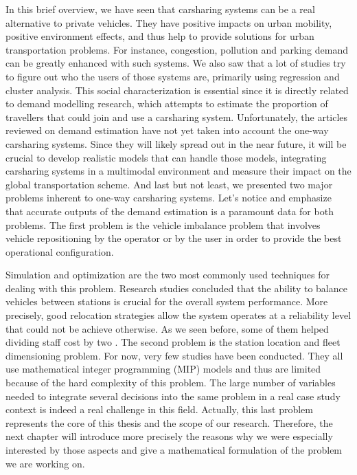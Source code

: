 \begin{bibunit}[ieeetr]
In this brief overview, we have seen that carsharing systems can be a real alternative to private vehicles.
They have positive impacts on urban mobility, positive environment effects, and thus help to provide solutions for urban transportation problems.
For instance, congestion, pollution and parking demand can be greatly enhanced with such systems.
We also saw that a lot of studies try to figure out who the users of those systems are, primarily
using regression and cluster analysis.
This social characterization is essential since it is directly related to demand modelling research, which attempts to estimate the proportion of
travellers that could join and use a carsharing system.
Unfortunately, the articles reviewed on demand estimation have not yet taken into account the one-way carsharing systems.
Since they will likely spread out in the near future, it will be crucial to develop realistic models that can handle those models, integrating carsharing systems in a multimodal environment and measure their impact on the global transportation scheme.
And last but not least, we presented two major problems inherent to one-way carsharing systems.
Let's notice and emphasize that accurate outputs of the demand estimation is a paramount data for both problems.
The first problem is the vehicle imbalance problem that involves vehicle repositioning by the operator or by the user in order to provide the best operational configuration.

\medskip
Simulation and optimization are the two most commonly used techniques for dealing with this problem.
Research studies concluded that the ability to balance vehicles between stations is crucial for the overall system performance.
More precisely, good relocation strategies allow the system operates at a reliability level that could not be achieve otherwise.
As we seen before, some of them helped dividing staff cost by two \cite{kek_decision_2009}.
The second problem is the station location and  fleet dimensioning problem.
For now, very few studies have been conducted.
They all use mathematical integer programming (MIP) models and thus are limited because of the hard complexity of this problem.
The large number of variables needed to integrate several decisions into the same problem in a real case study context is indeed a real challenge in this field.
Actually, this last problem represents the core of this thesis and the scope of our research.
Therefore, the next chapter will introduce more precisely the reasons why we were especially interested by those aspects and give a mathematical formulation of the problem we are working on.


\newpage
{}
\renewcommand{\bibname}{Bibliography of chapter \thechapter}
\end{bibunit}

